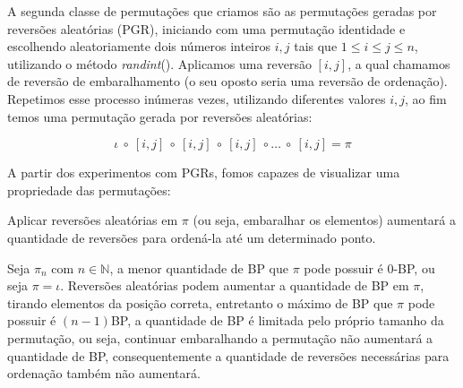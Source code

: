  A segunda classe de permutações que criamos são as permutações geradas por reversões aleatórias (PGR), iniciando com uma permutação identidade e escolhendo aleatoriamente dois números inteiros $i, j$ tais que  $1 \leq i \leq j \leq n$, utilizando o método \textit{randint}(). Aplicamos uma reversão $[i, j]$, a qual chamamos de reversão de embaralhamento (o seu oposto seria uma reversão de ordenação). Repetimos esse processo inúmeras vezes, utilizando diferentes valores $i, j$, ao fim temos uma permutação gerada por reversões aleatórias:
 
    \[\iota \ \circ \ [i, j] \ \circ \ [i, j] \ \circ \ [i, j] \ \circ \ldots \ \circ \ [i, j] = \pi\]
    
 A partir dos experimentos com PGRs, fomos capazes de visualizar uma propriedade das permutações:

\begin{prop}
\label{prop4}
Aplicar reversões aleatórias em $\pi$ (ou seja, embaralhar os elementos) aumentará a quantidade de reversões para ordená-la até um determinado ponto.
\end{prop}
\begin{prova}
Seja $\pi_n$ com $n \in \mathbb{N}$, a menor quantidade de BP que $\pi$ pode possuir é 0-BP, ou seja $\pi = \iota$. Reversões aleatórias podem aumentar a quantidade de BP em $\pi$, tirando elementos da posição correta, entretanto o máximo de BP que $\pi$ pode possuir é $(n-1)$BP, a quantidade de BP é limitada pelo próprio tamanho da permutação, ou seja, continuar embaralhando a permutação não aumentará a quantidade de BP, consequentemente a quantidade de reversões necessárias para ordenação também não aumentará. 
\end{prova}









